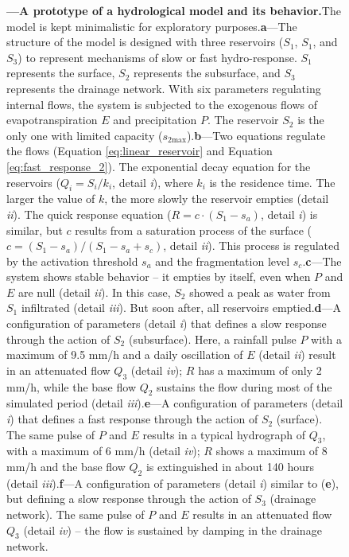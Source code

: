 \documentclass[./main_en.tex]{subfiles}
\begin{document}
\begin{figure}[t!]
	{\textbf{---\;A prototype of a hydrological \gls{model} and its behavior.}\;The \gls{model} is kept minimalistic for exploratory purposes.\;\textbf{a}\;---\;The structure of the \gls{model} is designed with three reservoirs ($S_1$, $S_1$, and $S_3$) to represent mechanisms of slow or fast \gls{hydro-response}. $S_1$ represents the surface, $S_2$ represents the subsurface, and $S_3$ represents the drainage network. With six \gls{parameters} regulating internal flows, the \gls{system} is subjected to the exogenous flows of evapotranspiration $E$ and precipitation $P$. The reservoir $S_2$ is the only one with limited capacity ($s_\text{2max}$).\;\textbf{b}\;---\;Two equations regulate the flows (Equation \eqref{eq:linear_reservoir} and Equation \eqref{eq:fast_response_2}). The exponential decay equation for the reservoirs ($Q_i = S_i/k_i$, detail \textrm{\textit{i}}), where $k_i$ is the residence time. The larger the value of $k$, the more slowly the reservoir empties (detail \textrm{\textit{ii}}). The quick response equation ($R = c\cdot (S_1 - s_a)$, detail \textrm{\textit{i}}) is similar, but $c$ results from a saturation process of the surface ($c = (S_1 - s_a)/(S_1 - s_a + s_c)$, detail \textrm{\textit{ii}}). This process is regulated by the activation threshold $s_a$ and the fragmentation level $s_c$.\;\textbf{c}\;---\;The \gls{system} shows stable behavior -- it empties by itself, even when $P$ and $E$ are null (detail \textrm{\textit{ii}}). In this case, $S_2$ showed a peak as water from $S_1$ infiltrated (detail \textrm{\textit{iii}}). But soon after, all reservoirs emptied.\;\textbf{d}\;---\;A configuration of \gls{parameters} (detail \textrm{\textit{i}}) that defines a slow response through the action of $S_2$ (subsurface). Here, a rainfall pulse $P$ with a maximum of 9.5 mm/h and a daily oscillation of $E$ (detail \textrm{\textit{ii}}) result in an attenuated flow $Q_3$ (detail \textrm{\textit{iv}}); $R$ has a maximum of only 2 mm/h, while the base flow $Q_2$ sustains the flow during most of the simulated period (detail \textrm{\textit{iii}}).\;\textbf{e}\;---\;A configuration of \gls{parameters} (detail \textrm{\textit{i}}) that defines a fast response through the action of $S_2$ (surface). The same pulse of $P$ and $E$ results in a typical hydrograph of $Q_3$, with a maximum of 6 mm/h (detail \textrm{\textit{iv}}); $R$ shows a maximum of 8 mm/h and the base flow $Q_2$ is extinguished in about 140 hours (detail \textrm{\textit{iii}}).\;\textbf{f}\;---\;A configuration of \gls{parameters} (detail \textrm{\textit{i}}) similar to (\textbf{e}), but defining a slow response through the action of $S_3$ (drainage network). The same pulse of $P$ and $E$ results in an attenuated flow $Q_3$ (detail \textrm{\textit{iv}}) -- the flow is sustained by damping in the drainage network.
	}
\label{fig:sys:proto}  %
\end{figure}
\end{document}
